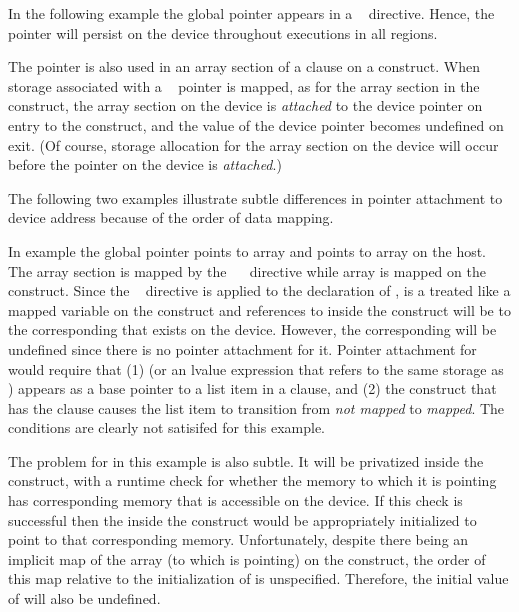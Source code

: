 In the following example the global pointer  appears in a
~ directive.  Hence, the pointer  will 
persist on the device throughout executions in all  regions.

The pointer is also used in an array section of a  clause on 
a  construct.  When storage associated with 
a ~ pointer
is mapped, as for the array section  in the
 construct, the array section on the device is \emph{attached}
to the device pointer  on entry to the construct, and
the value of the device pointer  becomes undefined on exit. 
(Of course, storage allocation for
the array section on the device will occur before the 
pointer on the device is \emph{attached}.)


The following two examples illustrate subtle differences in pointer attachment
to device address because of the order of data mapping.

In example  
the global pointer  points to array  and  points to
array  on the host.
The array section  is mapped by the ~~ directive while array  is mapped
on the  construct. 
Since the ~ directive is applied to the declaration
of ,  is a treated like a mapped variable on the 
construct and references to  inside the construct will be to the
corresponding  that exists on the device.  However, the corresponding
 will be undefined since there is no pointer attachment for it. Pointer
attachment for  would require that (1)  (or an lvalue
expression that refers to the same storage as ) appears as a base
pointer to a list item in a  clause, and (2) the construct that has
the  clause causes the list item to transition from \emph{not mapped}
to \emph{mapped}. The conditions are clearly not satisifed for this example.

The problem for  in this example is also subtle. It will be privatized
inside the  construct, with a runtime check for whether the memory
to which it is pointing has corresponding memory that is accessible on the
device. If this check is successful then the  inside the construct
would be appropriately initialized to point to that corresponding memory.
Unfortunately, despite there being an implicit map of the array  (to
which  is pointing) on the construct, the order of this map relative to
the initialization of  is unspecified. Therefore, the initial value of
 will also be undefined.

